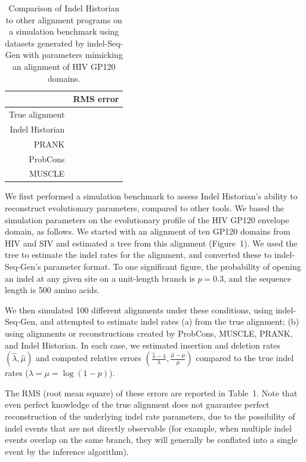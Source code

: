 \documentclass{bioinfo}
\begin{document}
\begin{table}
  \begin{tabular}{r|r}
    & RMS error \\
    \hline
True alignment & \\
Indel Historian & \\
PRANK & \\
ProbCons & \\
MUSCLE & \\
  \end{tabular}
  \caption{
    Comparison of Indel Historian to other alignment programs on a simulation benchmark
    using datasets generated by indel-Seq-Gen \citep{StropeEtAl2009}
    with parameters mimicking an alignment of HIV GP120 domains.
  }
\end{table}

We first performed a simulation benchmark to assess Indel Historian's ability to reconstruct evolutionary parameters,
compared to other tools.
We based the simulation parameters on the evolutionary profile of the HIV GP120 envelope domain, as follows.
We started with an alignment of ten GP120 domains from HIV and SIV and estimated a tree from this alignment (Figure~1).
We used the tree to estimate the indel rates for the alignment, and converted these to indel-Seq-Gen's parameter format.
To one significant figure, the probability of opening an indel at any given site on a unit-length branch is $p=0.3$, and the sequence length is 500 amino acids.

We then simulated 100 different alignments under these conditions, using indel-Seq-Gen, and attempted to estimate indel rates
(a) from the true alignment; (b) using alignments or reconstructions created by ProbCons, MUSCLE, PRANK, and Indel Historian.
In each case, we estimated insertion and deletion rates $(\hat{\lambda},\hat{\mu})$ and computed relative errors $(\frac{\hat{\lambda}-\lambda}{\lambda},\frac{\hat{\mu}-\mu}{\mu})$
compared to the true indel rates ($\lambda = \mu = \log(1-p)$).

The RMS (root mean square) of these errors are reported in Table~1.
Note that even perfect knowledge of the true alignment does not guarantee perfect reconstruction of the underlying indel rate parameters,
due to the possibility of indel events that are not directly observable (for example, when multiple indel events overlap on the same branch,
they will generally be conflated into a single event by the inference algorithm).
\end{document}

